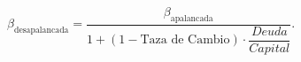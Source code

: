 \documentclass{standalone}
\begin{document}
\(\beta _ {\mbox{desapalancada}} =
\dfrac{\beta _ {\mbox{apalancada}}}
{1+(1- \mbox{Taza de Cambio}) \cdot 
\dfrac{Deuda}{Capital}}\).
\end{document}

